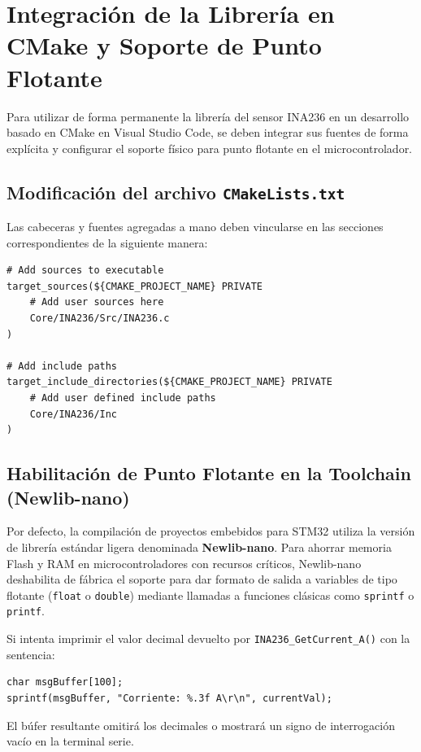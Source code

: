 \documentclass[
10pt, %
a4paper, %
oneside, %
headinclude,footinclude, %
BCOR5mm, %
]{scrartcl}
\begin{document}
\newpage
\section{Integración de la Librería en CMake y Soporte de Punto Flotante}

Para utilizar de forma permanente la librería del sensor INA236 en un desarrollo basado en CMake en Visual Studio Code, se deben integrar sus fuentes de forma explícita y configurar el soporte físico para punto flotante en el microcontrolador.

\subsection{Modificación del archivo \texttt{CMakeLists.txt}}
Las cabeceras y fuentes agregadas a mano deben vincularse en las secciones correspondientes de la siguiente manera:
\begin{lstlisting}[style=CMakeStyle]
# Add sources to executable
target_sources(${CMAKE_PROJECT_NAME} PRIVATE
    # Add user sources here
    Core/INA236/Src/INA236.c
)

# Add include paths
target_include_directories(${CMAKE_PROJECT_NAME} PRIVATE
    # Add user defined include paths
    Core/INA236/Inc
)
\end{lstlisting}

\subsection{Habilitación de Punto Flotante en la Toolchain (Newlib-nano)}
Por defecto, la compilación de proyectos embebidos para STM32 utiliza la versión de librería estándar ligera denominada \textbf{Newlib-nano}. Para ahorrar memoria Flash y RAM en microcontroladores con recursos críticos, Newlib-nano deshabilita de fábrica el soporte para dar formato de salida a variables de tipo flotante (\texttt{float} o \texttt{double}) mediante llamadas a funciones clásicas como \texttt{sprintf} o \texttt{printf}.

Si intenta imprimir el valor decimal devuelto por \texttt{INA236\_GetCurrent\_A()} con la sentencia:
\begin{lstlisting}[style=CMakeStyle]
char msgBuffer[100];
sprintf(msgBuffer, "Corriente: %.3f A\r\n", currentVal);
\end{lstlisting}
El búfer resultante omitirá los decimales o mostrará un signo de interrogación vacío en la terminal serie.
\end{document}
